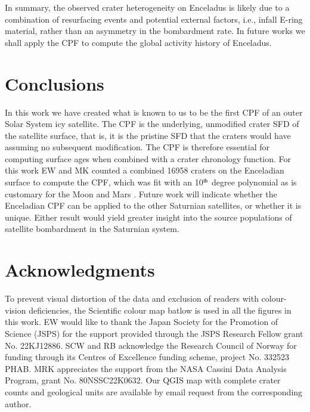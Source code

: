 \documentclass[preprint,11pt,3p,times,authoryear]{elsarticle}
\begin{document}
{In summary, the observed crater heterogeneity on Enceladus is likely due to a combination of resurfacing events and potential external factors, i.e., infall E-ring material, rather than an asymmetry in the bombardment rate. In future works we shall apply the CPF to compute the global activity history of Enceladus.

\section{Conclusions}
\label{sect:conclusion}
In this work we have created what is known to us to be the first CPF of an outer Solar System icy satellite. The CPF is the underlying, unmodified crater SFD of the satellite surface, that is, it is the pristine SFD that the craters would have assuming no subsequent modification. The CPF is therefore essential for computing surface ages when combined with a crater chronology function.
For this work EW and MK counted a combined 16958 craters on the Enceladian surface to compute the CPF, which was fit with an 10$^{\rm th}$ degree polynomial as is customary for the Moon and Mars \citep{Neukum1975, Neukum2001,Ivanov2001}. Future work will indicate whether the Enceladian CPF can be applied to the other Saturnian satellites, or whether it is unique. Either result would yield greater insight into the source populations of satellite bombardment in the Saturnian system.

\section*{Acknowledgments}
To prevent visual distortion of the data and exclusion of readers with colour-vision deficiencies, the Scientific colour map batlow \citet{Crameri2020} is used in all the figures in this work. EW would like to thank the Japan Society for the Promotion of Science (JSPS) for the support provided through the JSPS Research Fellow grant No. 22KJ12886. SCW and RB acknowledge the Research Council of Norway for funding through its Centres of Excellence funding scheme, project No. 332523 PHAB. MRK appreciates the support from the NASA Cassini Data Analysis Program, grant No. 80NSSC22K0632. Our QGIS map with complete crater counts and geological units are available by email request from the corresponding author.\\



{}
\pagebreak

\appendix
}
\end{document}
